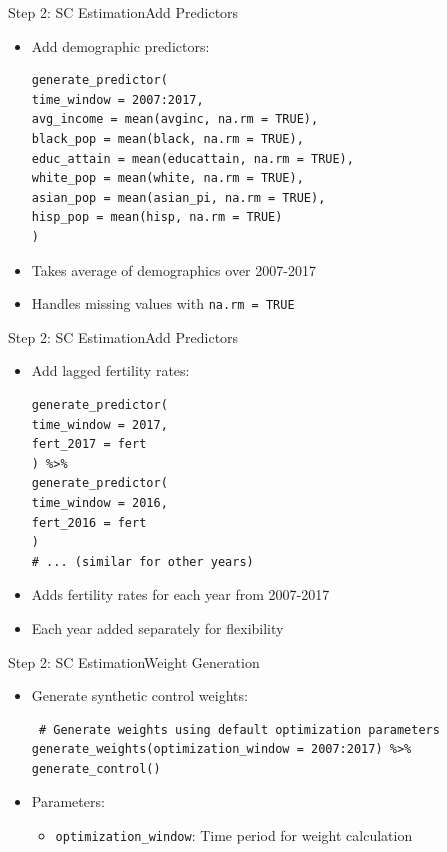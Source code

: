 \documentclass[hyperref={pdfpagelabels=false}]{beamer}
\begin{document}
\begin{frame}[fragile]{Step 2: SC Estimation}{Add Predictors}
\begin{itemize}
\item Add demographic predictors:
\vspace{0.2cm}
\begin{lstlisting}
generate_predictor(
time_window = 2007:2017,
avg_income = mean(avginc, na.rm = TRUE),
black_pop = mean(black, na.rm = TRUE),
educ_attain = mean(educattain, na.rm = TRUE),
white_pop = mean(white, na.rm = TRUE),
asian_pop = mean(asian_pi, na.rm = TRUE),
hisp_pop = mean(hisp, na.rm = TRUE)
)
\end{lstlisting}
\item Takes average of demographics over 2007-2017
\item Handles missing values with \texttt{na.rm = TRUE}
\end{itemize}
\end{frame}

\begin{frame}[fragile]{Step 2: SC Estimation}{Add Predictors}
\begin{itemize}
\item Add lagged fertility rates:
\vspace{0.2cm}
\begin{lstlisting}
generate_predictor(
time_window = 2017,
fert_2017 = fert
) %>%
generate_predictor(
time_window = 2016,
fert_2016 = fert
)
# ... (similar for other years)
\end{lstlisting}
\item Adds fertility rates for each year from 2007-2017
\item Each year added separately for flexibility
\end{itemize}
\end{frame}

\begin{frame}[fragile]{Step 2: SC Estimation}{Weight Generation}
\begin{itemize}
\item Generate synthetic control weights:
\vspace{0.2cm}
\begin{lstlisting}
 # Generate weights using default optimization parameters
generate_weights(optimization_window = 2007:2017) %>%
generate_control()
\end{lstlisting}
\item Parameters:
\begin{itemize}
\item \texttt{optimization\_window}: Time period for weight calculation
\end{itemize}
\end{itemize}
\end{frame}
\end{document}
